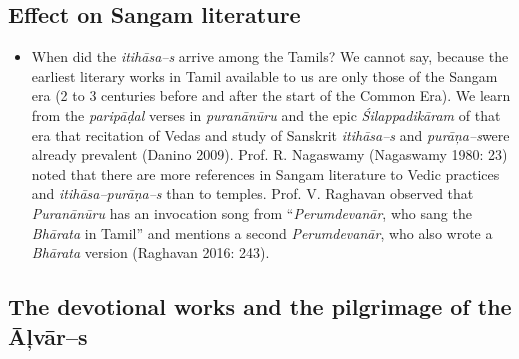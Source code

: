 \subsection*{Effect on Sangam literature}

\begin{itemize}
\item When did the \textit{itihāsa–s} arrive among the Tamils? We cannot say, because the earliest literary works in Tamil available to us are only those of the Sangam era (2 to 3 centuries before and after the start of the Common Era). We learn from the \textit{paripāḍal} verses in \textit{puranānūru} and the epic \textit{Śilappadikāram} of that era that recitation of Vedas and study of Sanskrit \textit{itihāsa–s} and \textit{purāņa–s}\break were already prevalent (Danino 2009). Prof. R. Nagaswamy (Nagaswamy 1980: 23) noted that there are more references in Sangam literature to Vedic practices and \textit{itihāsa–purāṇa–s} than to temples. Prof. V. Raghavan observed that \textit{Puranānūru} has an invocation song from “\textit{Perumdevanār}, who sang the \textit{Bhārata} in Tamil” and mentions a second \textit{Perumdevanār}, who also wrote a \textit{Bhārata} version (Raghavan 2016: 243).

\end{itemize}


\subsection*{The devotional works and the pilgrimage of the Āļvār–s}

